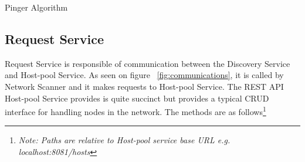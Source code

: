 \begin{center}
\begin{algorithm}[H]
\label{fig:pingeralgo}
\begin{center}
\end{center}


\caption{Pinger Algorithm}

\end{algorithm}
\end{center}

\subsection{Request Service} \label{requestservice}

Request Service is responsible of communication between the Discovery Service and Host-pool Service. As seen on figure ~\ref{fig:communications}, it is called by Network Scanner and it makes requests to Host-pool Service. The REST API Host-pool Service provides is quite succinct but provides a typical CRUD interface for handling nodes in the network. The methods are as follows\footnote{\textit{Note: Paths are relative to Host-pool service base URL e.g. localhost:8081/hosts}} 

